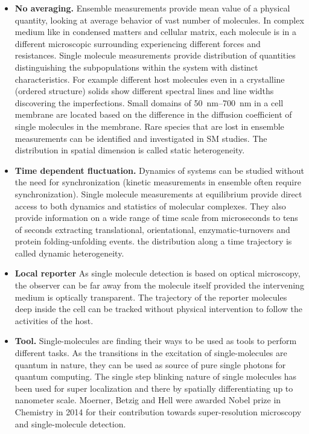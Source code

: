 \begin{itemize}
	\item \textbf{No averaging.} Ensemble measurements provide mean value of a physical quantity, looking at average behavior of vast number of molecules.
	In complex medium like in condensed matters and cellular matrix, each molecule is in a different microscopic surrounding experiencing different forces and resistances.
	Single molecule measurements provide distribution of quantities distinguishing the subpopulations within the system with distinct characteristics.
	For example different host molecules even in a crystalline (ordered structure) solids show different spectral lines and line widths discovering the imperfections.\cite{kozankiewicz1994single,reilly1993spectral}
	Small domains of \SIrange{50}{700}{\nm} in a cell membrane are located based on the difference in the diffusion coefficient of single molecules in the membrane.\cite{lommerse2004singlemolecule}
	Rare species that are lost in ensemble measurements can be identified and investigated in SM studies.
	The distribution in spatial dimension is called static heterogeneity.
	\item \textbf{Time dependent fluctuation.} Dynamics of systems can be studied without the need for synchronization (kinetic measurements in ensemble often require synchronization).
	Single molecule measurements at equilibrium provide direct access to both dynamics and statistics of molecular complexes.
	They also provide information on a wide range of time scale from microseconds to tens of seconds extracting translational, orientational, enzymatic-turnovers and protein folding-unfolding events.\cite{schmidt1996imaging,ruiter1997single,lu1998single-molecule,schuler2002probing}
	the distribution along a time trajectory is called dynamic heterogeneity.
	\item \textbf{Local reporter} As single molecule detection is based on optical microscopy, the observer can be far away from the molecule itself provided the intervening medium is optically transparent.
	The trajectory of the reporter molecules deep inside the cell can be tracked without physical intervention to follow the activities of the host.
	\item \textbf{Tool.} Single-molecules are finding their ways to be used as tools to perform different tasks.
	As the transitions in the excitation of single-molecules are quantum in nature, they can be used as source of pure single photons for quantum computing.\cite{lounis2000single,lounis2005singlephoton}
	The single step blinking nature of single molecules has been used for super localization and there by spatially differentiating up to nanometer scale.\cite{park2003superresolution,huang2008threedimensional}
	Moerner, Betzig and Hell were awarded Nobel prize in Chemistry in 2014 for their contribution towards super-resolution microscopy and single-molecule detection.
\end{itemize}

